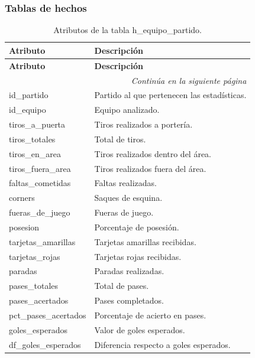\subsubsection{Tablas de hechos}

\begin{longtable}{|l|l|}
\caption{Atributos de la tabla h\_equipo\_partido.} \\

\hline
\textbf{Atributo} & \textbf{Descripción} \\
\hline
\endfirsthead

\hline
\textbf{Atributo} & \textbf{Descripción} \\
\hline
\endhead

\hline
\multicolumn{2}{r}{\textit{Continúa en la siguiente página}} \\
\hline
\endfoot

\hline
\endlastfoot

id\_partido & Partido al que pertenecen las estadísticas. \\
id\_equipo & Equipo analizado. \\
tiros\_a\_puerta & Tiros realizados a portería. \\
tiros\_totales & Total de tiros. \\
tiros\_en\_area & Tiros realizados dentro del área. \\
tiros\_fuera\_area & Tiros realizados fuera del área. \\
faltas\_cometidas & Faltas realizadas. \\
corners & Saques de esquina. \\
fueras\_de\_juego & Fueras de juego. \\
posesion & Porcentaje de posesión. \\
tarjetas\_amarillas & Tarjetas amarillas recibidas. \\
tarjetas\_rojas & Tarjetas rojas recibidas. \\
paradas & Paradas realizadas. \\
pases\_totales & Total de pases. \\
pases\_acertados & Pases completados. \\
pct\_pases\_acertados & Porcentaje de acierto en pases. \\
goles\_esperados & Valor de goles esperados. \\
df\_goles\_esperados & Diferencia respecto a goles esperados. \\
\hline

\end{longtable}

